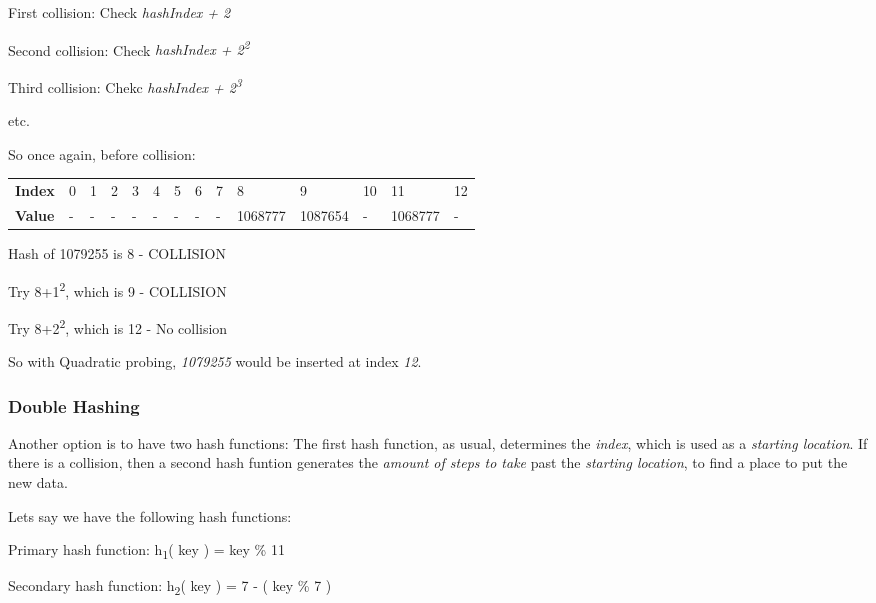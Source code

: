 \begin{DoxyItemize}
\item First collision\+: Check {\itshape hash\+Index + 2}
\item Second collision\+: Check {\itshape hash\+Index + 2\textsuperscript{2}}
\item Third collision\+: Chekc {\itshape hash\+Index + 2\textsuperscript{3}}
\item etc.
\end{DoxyItemize}

So once again, before collision\+:

\tabulinesep=1mm
\begin{longtabu} spread 0pt [c]{*14{|X[-1]}|}
\hline
{\bf Index }&0 &1 &2 &3 &4 &5 &6 &7 &8 &9 &10 &11 &12  \\
{\bf Value }&-\/ &-\/ &-\/ &-\/ &-\/ &-\/ &-\/ &-\/ &1068777 &1087654 &-\/ &1068777 &-\/  \\
\end{longtabu}



\begin{DoxyItemize}
\item Hash of 1079255 is 8 -\/ C\+O\+L\+L\+I\+S\+I\+ON
\item Try 8+1\textsuperscript{2}, which is 9 -\/ C\+O\+L\+L\+I\+S\+I\+ON
\item Try 8+2\textsuperscript{2}, which is 12 -\/ No collision
\end{DoxyItemize}

So with Quadratic probing, {\itshape 1079255} would be inserted at index {\itshape 12}.

\subsubsection*{Double Hashing}

Another option is to have two hash functions\+: The first hash function, as usual, determines the {\itshape index}, which is used as a {\itshape starting location}. If there is a collision, then a second hash funtion generates the {\itshape amount of steps to take} past the {\itshape starting location}, to find a place to put the new data.

Let\textquotesingle{}s say we have the following hash functions\+:


\begin{DoxyItemize}
\item Primary hash function\+: h\textsubscript{1}( key ) = key \% 11
\item Secondary hash function\+: h\textsubscript{2}( key ) = 7 -\/ ( key \% 7 )
\end{DoxyItemize}

